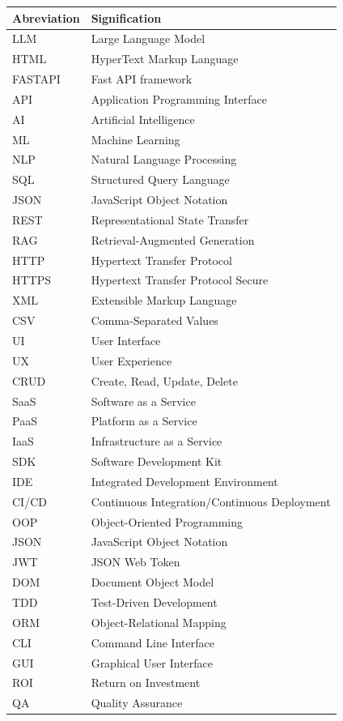 \documentclass[a4paper, 11pt, openany]{report}
\begin{document}
\begin{tabular}{ll}
\textbf{Abreviation} & \textbf{Signification} \\
\hline
LLM & Large Language Model \\
HTML & HyperText Markup Language \\
FASTAPI & Fast API framework \\
API & Application Programming Interface \\
AI & Artificial Intelligence \\
ML & Machine Learning \\
NLP & Natural Language Processing \\
SQL & Structured Query Language \\
JSON & JavaScript Object Notation \\
REST & Representational State Transfer \\
RAG & Retrieval-Augmented Generation \\
HTTP & Hypertext Transfer Protocol \\
HTTPS & Hypertext Transfer Protocol Secure \\
XML & Extensible Markup Language \\
CSV & Comma-Separated Values \\
UI & User Interface \\
UX & User Experience \\
CRUD & Create, Read, Update, Delete \\
SaaS & Software as a Service \\
PaaS & Platform as a Service \\
IaaS & Infrastructure as a Service \\
SDK & Software Development Kit \\
IDE & Integrated Development Environment \\
CI/CD & Continuous Integration/Continuous Deployment \\
OOP & Object-Oriented Programming \\
JSON & JavaScript Object Notation \\
JWT & JSON Web Token \\
DOM & Document Object Model \\
TDD & Test-Driven Development \\
ORM & Object-Relational Mapping \\
CLI & Command Line Interface \\
GUI & Graphical User Interface \\
ROI & Return on Investment \\
QA & Quality Assurance \\
\end{tabular}
\end{document}
